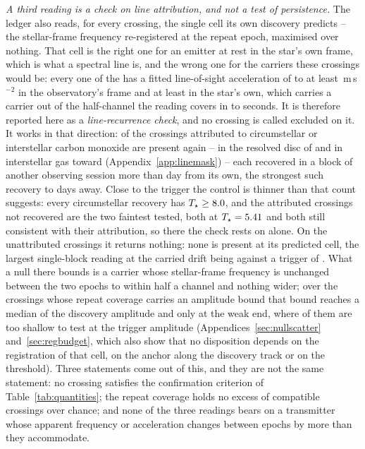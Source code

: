 \emph{A third reading is a check on line attribution, and not a test of
persistence.} The ledger also reads, for every crossing, the single cell its
own discovery predicts -- the stellar-frame frequency re-registered at the
repeat epoch, maximised over nothing. That cell is the right one for an
emitter at rest in the star's own frame, which is what a spectral line is, and
the wrong one for the carriers these crossings would be: every one of the
\RcNExcl{} has a fitted line-of-sight acceleration of \ZtALosLo{} to at least
\ZtALosHi\,m\,s$^{-2}$ in the observatory's frame and at least
\EgStarALosHi{} in the star's own, which carries a carrier out of the
half-channel the reading covers in \ZtSxLeaveSec{} to \ZtCpLeaveSec{}
seconds. It is therefore reported here as a \emph{line-recurrence check}, and
no crossing is called excluded on it. It works in that direction:
\MkAttrRecur{} of the \MkAttrTested{} crossings attributed to circumstellar or
interstellar carbon monoxide are present again -- \RqNRecurDisc{} in the
resolved disc of \RqRecurDiscStars{} and \RqNRecurCloud{} in interstellar gas
toward \RqRecurCloudStars{} (Appendix~\ref{app:linemask}) -- each recovered in
a block of another observing session more than \EpSep{} day from its own, the
strongest such recovery \QcSepMinD{} to \QcSepMaxD{} days away. Close to the
trigger the control is thinner than that count suggests: every circumstellar
recovery has $T_\star\ge8.0$, and the \MkAttrExcl{} attributed
crossings not recovered are the two faintest tested, both at
$T_\star=5.41$ and both still consistent with their attribution, so
there the check rests on \RqRecurCloudStars{} alone. On the \RcNTested{}
unattributed crossings it returns nothing: none is present at its predicted
cell, the largest single-block reading at the carried drift being
\RcTMatched{} against a trigger of \StageNullTrig. What a null there bounds is
a carrier whose stellar-frame frequency is unchanged between the two epochs to
within half a channel and nothing wider; over the \RcNExcl{} crossings whose
repeat coverage carries an amplitude bound that bound reaches a median
\RcFracMed{} of the discovery amplitude and only \RcFracMax{} at the weak end,
where \HjNPowerLo{} of them are too shallow to test at the trigger
amplitude
(Appendices~\ref{sec:nullscatter}
and~\ref{sec:regbudget}, which also show that no disposition depends on the
registration of that cell, on the anchor along the discovery track or on the
threshold). Three statements come out of this, and they are not the same
statement: no crossing satisfies the confirmation criterion of
Table~\ref{tab:quantities}; the repeat coverage holds no excess of compatible
crossings over chance; and none of the three readings bears on a transmitter
whose apparent frequency or acceleration changes between epochs by more than
they accommodate.


